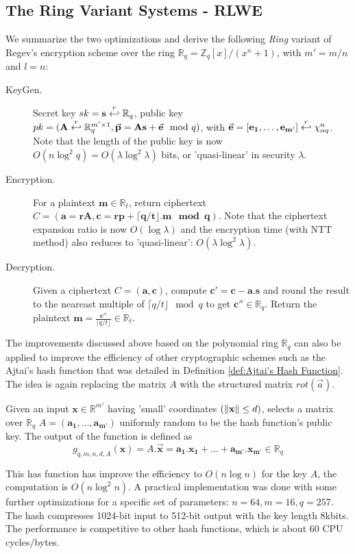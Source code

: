 \subsection{The Ring Variant Systems - RLWE}
\label{sec:RLWEPre}
We summarize the two optimizations and derive the following \emph{Ring} variant
of Regev's encryption scheme over the ring
$\mathbb{R}_q = \mathbb{Z}_q[x]/(x^n + 1)$, with $m' = m/n$ and $l = n$:
\begin{description}
\item[KeyGen.] Secret key $sk = \mathbf{s} \stackrel{r}{\hookleftarrow} \mathbb{R}_q$, public
  key
  $pk = (\mathbf{A} \stackrel{r}{\hookleftarrow} \mathbb{R}_q^{m' \times 1}, \vec{\mathbf{p}} =
  \mathbf{As} + \vec{\mathbf{e}} \mod q )$, with
  $\vec{\mathbf{e}} = [\mathbf{e_1, \dots, e_{m'}}] \stackrel{r}{\hookleftarrow} \chi_{\alpha
    q}^n$. Note that the length of the public key is now
  $O(n \log^2 q) = O(\lambda \log^2 \lambda)$ bits, or 'quasi-linear' in
  security $\lambda$.
\item [Encryption.] For a plaintext $\mathbf{m} \in \mathbb{R}_t$, return
  ciphertext
  $C = (\mathbf{a = rA}, \mathbf{c = rp + \lceil q/t \rfloor. m \mod q })$. Note
  that the ciphertext expansion ratio is now $O(\log \lambda)$ and the
  encryption time (with NTT method) also reduces to 'quasi-linear':
  $O(\lambda \log^2 \lambda)$.
\item [Decryption.] Given a ciphertext $C = \mathbf{(a,c)}$, compute
  $\mathbf{c' = c - a.s}$ and round the result to the neareast multiple of
  $\lceil q/t \rfloor \mod q$ to get $\mathbf{c''} \in \mathbb{R}_q$. Return the
  plaintext
  $\mathbf{m} = \frac{\mathbf{c''}}{\lceil q/t \rfloor} \in \mathbb{R}_t$.
\end{description}
The improvements discussed above based on the polynomial ring $\mathbb{R}_q$ can
also be applied to improve the efficiency of other cryptographic schemes such as
the Ajtai's hash function that was detailed in Definition \ref{def:Ajtai's Hash
  Function}. The idea is again replacing the matrix $A$ with the structured
matrix $rot(\vec{a})$.

\begin{definition}
   Given an input
  $\mathbf{x} \in \mathbb{R}^{m'}$ having 'small' coordinates
  $(\Vert \mathbf{x} \Vert \leq d)$, selects a matrix over $\mathbb{R}_q$
  $A=(\mathbf{a_1, \dots, a_{m'}})$ uniformly random to be the hash function's
  public key.  The output of the function is defined as
  \[
    g_{q,m,n,d,A}(\mathbf{x}) = A.\vec{\mathbf{x}} = \mathbf{a_1.x_1 + \dots +
      a_{m'}.x_{m'}} \in \mathbb{R}_q
  \]
  \label{def:AjtaiRing}
\end{definition}
This has function has improve the efficiency to $O(n\log n)$ for the key $A$,
the computation is $O(n\log^2 n)$. A practical implementation was done
\cite{lyubashevsky2008swifft} with some further optimizations for a specific set
of parameters: $n = 64, m = 16, q = 257$. The hash compresses 1024-bit input to
512-bit output with the key length 8kbits. The performance is competitive to
other hash functions, which is about 60 CPU cycles/bytes.

